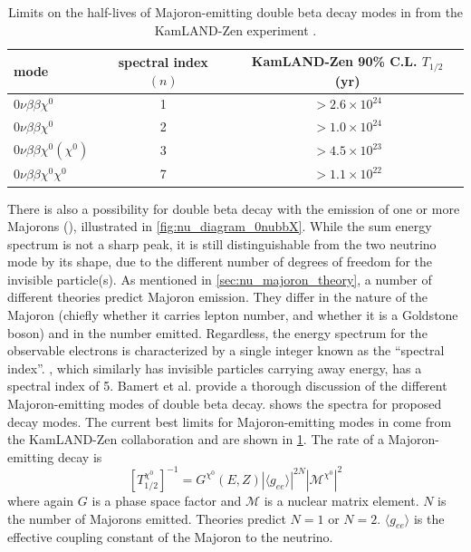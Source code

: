 \documentclass[herrin-thesis.tex]{subfiles}
\begin{document}
\begin{table}[tbp]
\centering
\caption[Current limits on \zeronuXpX{}]{Limits on the half-lives of Majoron-emitting double beta decay modes in  from the KamLAND-Zen experiment \cite{Gando:2012fk}.}
\label{tab:nu_majoron_limits}
\begin{tabular}{l c c}\toprule
	mode						&	spectral index \((n)\)		&	KamLAND-Zen 90\% C.L. \(T_{1/2}\) (yr)		\\\midrule
	\(0\nu\beta\beta\chi^{0}\)			&	1					&	\(>2.6\times10^{24}\)						\\
	\(0\nu\beta\beta\chi^{0}\)			&	2					&	\(>1.0\times10^{24}\)						\\
	\(0\nu\beta\beta\chi^{0}(\chi^{0})\)	&	3					&	\(>4.5\times10^{23}\)						\\
	\(0\nu\beta\beta\chi^{0}\chi^{0}\)	&	7					&	\(>1.1\times10^{22}\)						\\\bottomrule
\end{tabular}
\end{table}

There is also a possibility for double beta decay with the emission of one or more Majorons (\zeronuXpX{}), illustrated in \cref{fig:nu_diagram_0nubbX}. While the sum energy spectrum is not a sharp peak, it is still distinguishable from the two neutrino mode by its shape, due to the different number of degrees of freedom for the invisible particle(s). As mentioned in \cref{sec:nu_majoron_theory}, a number of different theories predict Majoron emission. They differ in the nature of the Majoron (chiefly whether it carries lepton number, and whether it is a Goldstone boson) and in the number emitted. Regardless, the energy spectrum for the observable electrons is characterized by a single integer known as the ``spectral index''. \twonu{}, which similarly has invisible particles carrying away energy, has a spectral index of 5. Bamert et al. \cite{Bamert:1995fk} provide a thorough discussion of the different Majoron-emitting modes of double beta decay.  shows the spectra for proposed decay modes. The current best limits for Majoron-emitting modes in  come from the KamLAND-Zen collaboration \cite{Gando:2012fk} and are shown in \cref{tab:nu_majoron_limits}. The rate of a Majoron-emitting decay is
\begin{equation}
\left [ T^{\chi^0}_{1/2} \right ]^{-1} = G^{\chi^{0}}\left(E, Z\right)\left | \langle g_{e e} \rangle \right |^{2N}\left | \mathcal{M}^{\chi^{0}}\right |^2
\label{eq:nu_majoron_rate}
\end{equation}
where again \(G\) is a phase space factor and \(\mathcal{M}\) is a nuclear matrix element. \(N\) is the number of Majorons emitted. Theories predict \(N=1\) or \(N=2\). \(\langle g_{e e} \rangle\) is the effective coupling constant of the Majoron to the neutrino.
\end{document}
